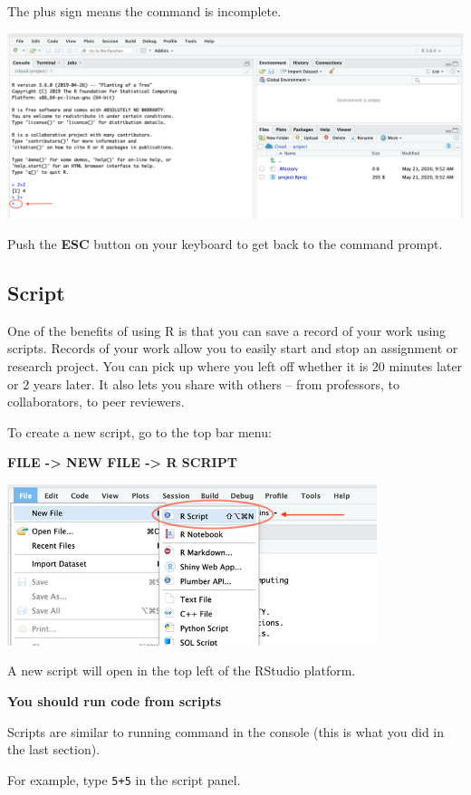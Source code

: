 \documentclass[
]{book}
\begin{document}
The plus sign means the command is incomplete.

\includegraphics{img/waiting.png}

Push the \textbf{ESC} button on your keyboard to get back to the command prompt.

\hypertarget{script}{%
\subsection{Script}\label{script}}

One of the benefits of using R is that you can save a record of your work using scripts. Records of your work allow you to easily start and stop an assignment or research project. You can pick up where you left off whether it is 20 minutes later or 2 years later. It also lets you share with others -- from professors, to collaborators, to peer reviewers.

To create a new script, go to the top bar menu:

\textbf{FILE -\textgreater{} NEW FILE -\textgreater{} R SCRIPT}

\includegraphics{img/newscript.png}

A new script will open in the top left of the RStudio platform.

\textbf{You should run code from scripts}

Scripts are similar to running command in the console (this is what you did in the last section).

For example, type \texttt{5+5} in the script panel.
\end{document}
